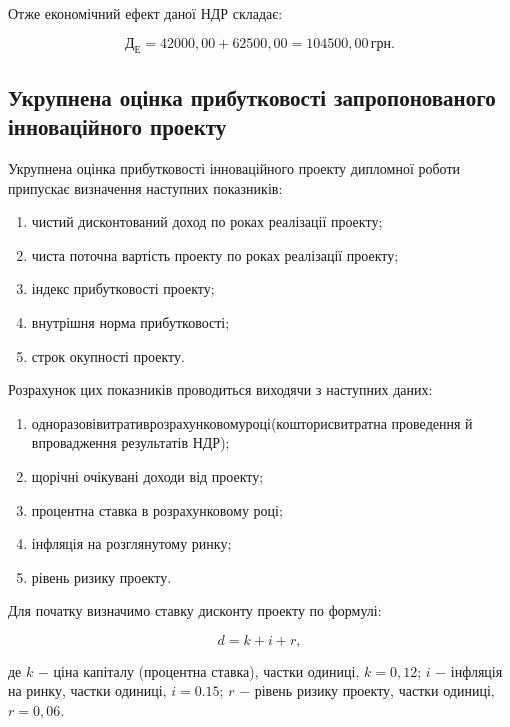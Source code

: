 Отже економічний ефект даної НДР складає:

\[
	\text{Д}_{\text{Е}} = 42000,00 + 62500,00 = 104500,00 \, \text{грн}.
\]

\vspace{1.5em}

\subsection{Укрупнена оцінка прибутковості запропонованого інноваційного проекту}

Укрупнена оцінка прибутковості інноваційного проекту дипломної роботи припускає визначення наступних показників:

\begin{enumerate}
	\item чистий дисконтований доход по роках реалізації проекту;
	\item чиста поточна вартість проекту по роках реалізації проекту;
	\item індекс прибутковості проекту;
	\item внутрішня норма прибутковості;
	\item строк окупності проекту.
\end{enumerate}

Розрахунок цих показників проводиться виходячи з наступних даних:

\begin{enumerate}
	\item одноразові\hfill витрати\hfill в\hfill розрахунковому\hfill році\hfill (кошторис\hfill витрат\hfill на\newline \hspace*{-20mm} проведення й впровадження результатів НДР);
	\item щорічні очікувані доходи від проекту;
	\item процентна ставка в розрахунковому році;
	\item інфляція на розглянутому ринку;
	\item рівень ризику проекту.
\end{enumerate}

Для початку визначимо ставку дисконту проекту по формулі:

\begin{equation}\label{eq:economy12}
	d = k + i + r,
\end{equation}

\noindent де $k$ $-$ ціна капіталу (процентна ставка), частки одиниці, $k = 0,12$;\newline
\hspace*{19pt}$i$ $-$ інфляція на ринку, частки одиниці, $i = 0.15$;\newline
\hspace*{19pt}$r$ $-$ рівень ризику проекту, частки одиниці, $r = 0,06$.

